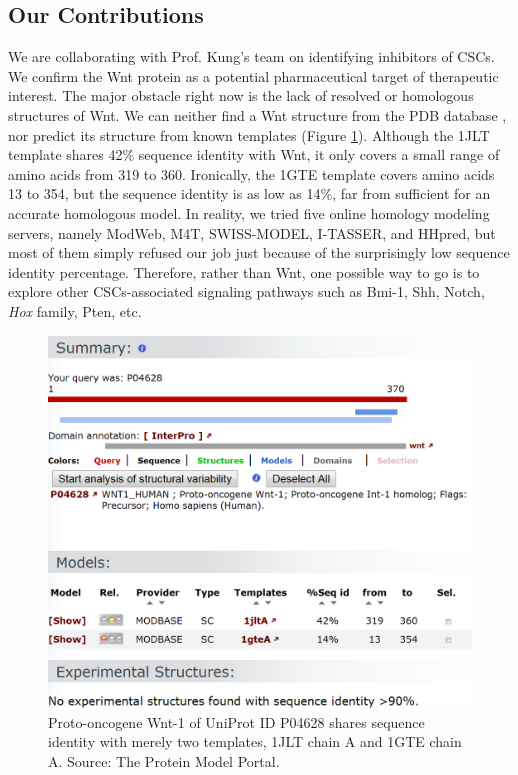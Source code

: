 \subsection{Our Contributions}

We are collaborating with Prof. Kung's team on identifying inhibitors of CSCs. We confirm the Wnt protein as a potential pharmaceutical target of therapeutic interest. The major obstacle right now is the lack of resolved or homologous structures of Wnt. We can neither find a Wnt structure from the PDB database \citep{540,537}, nor predict its structure from known templates (Figure \ref{Case:WntHomologyModeling}). Although the 1JLT template shares 42\% sequence identity with Wnt, it only covers a small range of amino acids from 319 to 360. Ironically, the 1GTE template covers amino acids 13 to 354, but the sequence identity is as low as 14\%, far from sufficient for an accurate homologous model. In reality, we tried five online homology modeling servers, namely ModWeb, M4T, SWISS-MODEL, I-TASSER, and HHpred, but most of them simply refused our job just because of the surprisingly low sequence identity percentage. Therefore, rather than Wnt, one possible way to go is to explore other CSCs-associated signaling pathways such as Bmi-1, Shh, Notch, \textit{Hox} family, Pten, etc.

\begin{figure}
\centering
\includegraphics[width=\linewidth]{Case/WntHomologyModeling.png}
\caption{Proto-oncogene Wnt-1 of UniProt ID P04628 shares sequence identity with merely two templates, 1JLT chain A and 1GTE chain A. Source: The Protein Model Portal.}
\label{Case:WntHomologyModeling}
\end{figure}

\chapterend
